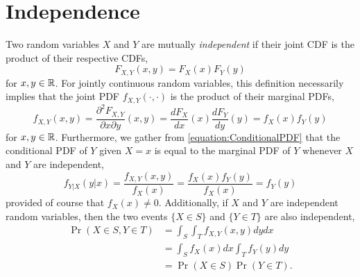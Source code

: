\section{Independence}

Two random variables $X$ and $Y$ are mutually \emph{independent} if their joint CDF is the product of their respective CDFs, 
\begin{equation*}
F_{X,Y} (x,y) = F_X (x) F_Y(y)
\end{equation*}
for $x, y \in \mathbb{R}$.
For jointly continuous random variables, this definition necessarily implies that the joint PDF $f_{X,Y}(\cdot, \cdot)$ is the product of their marginal PDFs,
\begin{equation*}
f_{X,Y} (x,y) = \frac{\partial^2 F_{X,Y}}{\partial x \partial y} (x, y)
= \frac{d F_X}{dx} (x) \frac{d F_Y}{dy} (y)
= f_X (x) f_Y (y)
\end{equation*}
for $x, y \in \mathbb{R}$.
Furthermore, we gather from \eqref{equation:ConditionalPDF} that the conditional PDF of $Y$ given $X=x$ is equal to the marginal PDF of $Y$ whenever $X$ and $Y$ are independent,
\begin{equation*}
f_{Y|X} (y|x) = \frac{f_{X,Y} (x, y)}{f_X(x)}
= \frac{f_X (x) f_Y (y)}{f_X(x)} = f_Y (y)
\end{equation*}
provided of course that $f_X(x) \neq 0$.
Additionally, if $X$ and $Y$ are independent random variables, then the two events $\{ X \in S \}$ and $\{ Y \in T \}$ are also independent,
\begin{equation*}
\begin{split}
\Pr (X \in S, Y \in T) &= \int_S \int_T f_{X,Y} (x,y) dy dx \\
&= \int_S f_X (x) dx \int_T f_Y (y) dy \\
&= \Pr (X \in S) \Pr (Y \in T).
\end{split}
\end{equation*}

